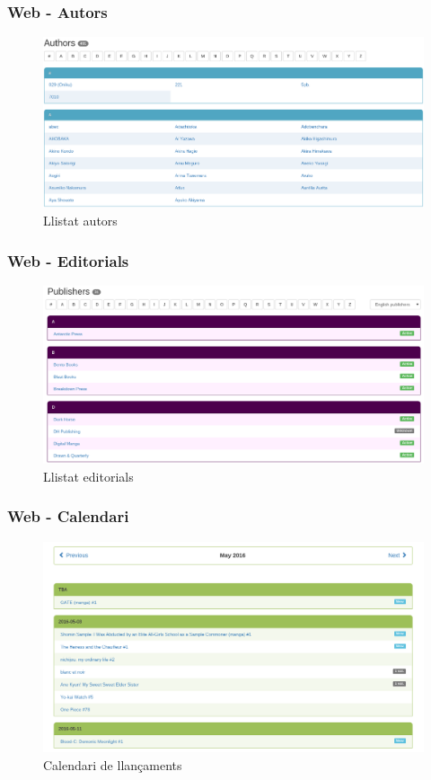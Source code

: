 \documentclass{beamer}
\begin{document}
	\begin{frame}
	\frametitle{Web - Autors}
		\begin{figure}
			\centering
			\includegraphics[width=1\textwidth]{authors.png}
			\caption{Llistat autors}
		\end{figure}
	\end{frame}

	\begin{frame}
	\frametitle{Web - Editorials}
		\begin{figure}
			\centering
			\includegraphics[width=1\textwidth]{publishers.png}
			\caption{Llistat editorials}
		\end{figure}
	\end{frame}

	\begin{frame}
	\frametitle{Web - Calendari}
		\begin{figure}
			\centering
			\includegraphics[width=1\textwidth]{calendar.png}
			\caption{Calendari de llançaments}
		\end{figure}
	\end{frame}
\end{document}
